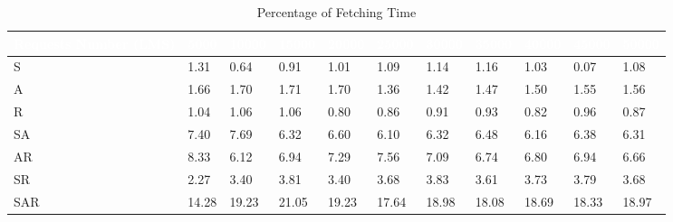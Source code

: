 \begin{table}[t]
\centering
\begin{tabular}{|l|l|l|l|l|l|l|l|l|l|l|}   
\hline  \rowcolor{black} \scriptsize \bf \textcolor {white}{ Requests Number (LMS)}
& \scriptsize \bf \textcolor {white}{5000}
& \scriptsize \bf \textcolor {white}{10000}
& \scriptsize \bf \textcolor  {white}{15000}
& \scriptsize \bf \textcolor  {white}{20000}
& \scriptsize \bf \textcolor  {white}{25000}
& \scriptsize \bf \textcolor  {white}{30000} 
& \scriptsize \bf \textcolor  {white}{35000}
& \scriptsize \bf \textcolor  {white}{40000}
& \scriptsize \bf \textcolor  {white}{45000}
& \scriptsize \bf \textcolor {white}{50000}\\ \hline

\scriptsize  {S }
& \scriptsize  {1.31}
& \scriptsize {0.64}
& \scriptsize {0.91}
& \scriptsize {1.01}
& \scriptsize {1.09}
& \scriptsize {1.14}
& \scriptsize {1.16}
& \scriptsize {1.03}
& \scriptsize {0.07}
& \scriptsize {1.08}
\\ \hline

\scriptsize  {A }
& \scriptsize  {1.66}
& \scriptsize {1.70}
& \scriptsize {1.71}
& \scriptsize {1.70}
& \scriptsize {1.36}
& \scriptsize {1.42}
& \scriptsize {1.47}
& \scriptsize {1.50}
& \scriptsize {1.55}
& \scriptsize {1.56}
\\ \hline


\scriptsize  {R}
& \scriptsize  {1.04}
& \scriptsize {1.06}
& \scriptsize {1.06}
& \scriptsize {0.80}
& \scriptsize {0.86}
& \scriptsize {0.91}
& \scriptsize {0.93}
& \scriptsize {0.82}
& \scriptsize {0.96}
& \scriptsize {0.87}
\\ \hline

\scriptsize  {SA}
& \scriptsize  {7.40}
& \scriptsize {7.69}
& \scriptsize {6.32}
& \scriptsize {6.60}
& \scriptsize {6.10}
& \scriptsize {6.32}
& \scriptsize {6.48}
& \scriptsize {6.16}
& \scriptsize {6.38}
& \scriptsize {6.31}
\\ \hline

\scriptsize  {AR}
& \scriptsize  {8.33}
& \scriptsize {6.12}
& \scriptsize {6.94}
& \scriptsize {7.29}
& \scriptsize {7.56}
& \scriptsize {7.09}
& \scriptsize {6.74}
& \scriptsize {6.80}
& \scriptsize {6.94}
& \scriptsize {6.66}
\\ \hline

\scriptsize  {SR}
& \scriptsize  {2.27}
& \scriptsize {3.40}
& \scriptsize {3.81}
& \scriptsize {3.40}
& \scriptsize {3.68}
& \scriptsize {3.83}
& \scriptsize {3.61}
& \scriptsize {3.73}
& \scriptsize {3.79}
& \scriptsize {3.68}
\\ \hline


\scriptsize  {SAR}
& \scriptsize {14.28}
& \scriptsize {19.23}
& \scriptsize {21.05}
& \scriptsize {19.23}
& \scriptsize {17.64}
& \scriptsize {18.98}
& \scriptsize {18.08}
& \scriptsize {18.69}
& \scriptsize {18.33}
& \scriptsize {18.97}
\\ \hline
\end{tabular}

\caption{Percentage of Fetching Time}\end{table}


